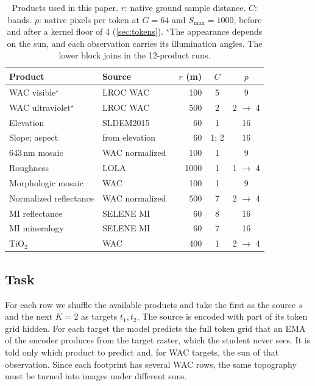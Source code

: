 \begin{table}[t]
  \centering
  \footnotesize
  \setlength{\tabcolsep}{2.1pt}
  \caption{Products used in this paper. $r$: native ground sample distance. $C$: bands. $p$: native pixels per token at $G{=}64$ and $S_{\max}{=}1000$, before and after a kernel floor of 4 (\cref{sec:tokens}). $^\star$The appearance depends on the sun, and each observation carries its illumination angles. The lower block joins in the 12-product runs.}
  \label{tab:modalities}
  \begin{tabular}{@{}llrcc@{}}
    \toprule
    Product & Source & $r$ (m) & $C$ & $p$ \\
    \midrule
    WAC visible$^\star$       & LROC WAC~\cite{robinson2010lunar}      & 100  & 5    & 9 \\
    WAC ultraviolet$^\star$   & LROC WAC                               & 500  & 2    & 2 $\to$ 4 \\
    Elevation                 & SLDEM2015~\cite{barker2016new}         & 60   & 1    & 16 \\
    Slope; aspect             & from elevation                         & 60   & 1; 2 & 16 \\
    643\,nm mosaic            & WAC normalized~\cite{boyd2012lunar}    & 100  & 1    & 9 \\
    Roughness                 & LOLA~\cite{kreslavsky2013lunar}        & 1000 & 1    & 1 $\to$ 4 \\
    \midrule
    Morphologic mosaic        & WAC~\cite{speyerer2011lunar}           & 100  & 1    & 9 \\
    Normalized reflectance    & WAC normalized~\cite{boyd2012lunar}    & 500  & 7    & 2 $\to$ 4 \\
    MI reflectance            & SELENE MI~\cite{lemelin2016global}     & 60   & 8    & 16 \\
    MI mineralogy             & SELENE MI~\cite{lemelin2016global}     & 60   & 7    & 16 \\
    TiO$_2$                   & WAC~\cite{sato2017lunar}               & 400  & 1    & 2 $\to$ 4 \\
    \bottomrule
  \end{tabular}
\end{table}

\subsection{Task}
\label{sec:task}

For each row we shuffle the available products and take the first as the source $s$ and the next $K{=}2$ as targets $t_1, t_2$. The source is encoded with part of its token grid hidden. For each target the model predicts the full token grid that an EMA of the encoder produces from the target raster, which the student never sees. It is told only which product to predict and, for WAC targets, the sun of that observation. Since each footprint has several WAC rows, the same topography must be turned into images under different suns.

